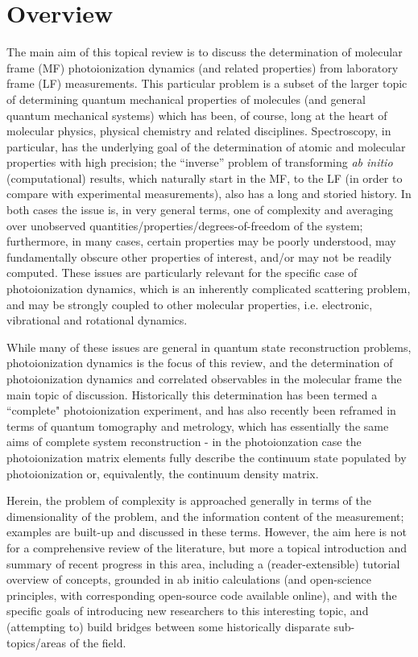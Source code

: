 \section{Overview}
The main aim of this topical review is to discuss the determination of molecular frame (MF) photoionization dynamics (and related properties) from laboratory frame (LF) measurements. This particular problem is a subset of the larger topic of determining quantum mechanical properties of molecules (and general quantum mechanical systems) which has been, of course, long at the heart of molecular physics, physical chemistry and related disciplines. Spectroscopy, in particular, has the underlying goal of the determination of atomic and molecular properties with high precision; the ``inverse” problem of transforming \textit{ab initio} (computational) results, which naturally start in the MF, to the LF (in order to compare with experimental measurements), also has a long and storied history. In both cases the issue is, in very general terms, one of complexity and averaging over unobserved quantities/properties/degrees-of-freedom of the system; furthermore, in many cases, certain properties may be poorly understood, may fundamentally obscure other properties of interest, and/or may not be readily computed. These issues are particularly relevant for the specific case of photoionization dynamics, which is an inherently complicated scattering problem, and may be strongly coupled to other molecular properties, i.e. electronic, vibrational and rotational dynamics. 

While many of these issues are general in quantum state reconstruction problems, photoionization dynamics is the focus of this review, and the determination of photoionization dynamics and correlated observables in the molecular frame the main topic of discussion. Historically this determination has been termed a ``complete" photoionization experiment, and has also recently been reframed in terms of quantum tomography and metrology, which has essentially the same aims of complete system reconstruction - in the photoionzation case the photoionization matrix elements fully describe the continuum state populated by photoionization or, equivalently, the continuum density matrix.

Herein, the problem of complexity is approached generally in terms of the dimensionality of the problem, and the information content of the measurement; examples are built-up and discussed in these terms. However, the aim here is not for a comprehensive review of the literature, but more a topical introduction and summary of recent progress in this area, including a (reader-extensible) tutorial overview of concepts, grounded in ab initio calculations (and open-science principles, with corresponding open-source code available online), and with the specific goals of introducing new researchers to this interesting topic, and (attempting to) build bridges between some historically disparate sub-topics/areas of the field.


